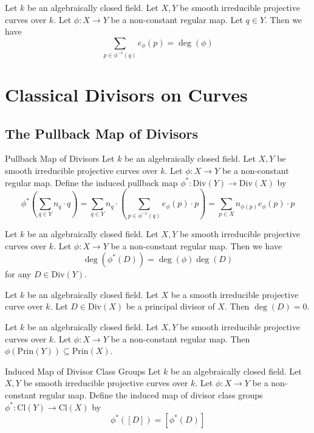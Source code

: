 \documentclass[a4paper]{article}
\begin{document}
\begin{prp}{}{} Let $k$ be an algebraically closed field. Let $X,Y$ be smooth irreducible projective curves over $k$. Let $\phi:X\to Y$ be a non-constant regular map. Let $q\in Y$. Then we have $$\sum_{p\in\phi^{-1}(q)}e_\phi(p)=\deg(\phi)$$
\end{prp}

\pagebreak
\section{Classical Divisors on Curves}
\subsection{The Pullback Map of Divisors}
\begin{defn}{Pullback Map of Divisors}{} Let $k$ be an algebraically closed field. Let $X,Y$ be smooth irreducible projective curves over $k$. Let $\phi:X\to Y$ be a non-constant regular map. Define the induced pullback map $\phi^\ast:\text{Div}(Y)\to\text{Div}(X)$ by $$\phi^\ast\left(\sum_{q\in Y} n_q\cdot q\right)=\sum_{q\in Y}n_q\cdot\left(\sum_{p\in\phi^{-1}(q)}e_\phi(p)\cdot p\right)=\sum_{p\in X}n_{\phi(p)}e_\phi(p)\cdot p$$
\end{defn}

\begin{prp}{}{} Let $k$ be an algebraically closed field. Let $X,Y$ be smooth irreducible projective curves over $k$. Let $\phi:X\to Y$ be a non-constant regular map. Then we have $$\deg(\phi^\ast(D))=\deg(\phi)\deg(D)$$ for any $D\in\text{Div}(Y)$. 
\end{prp}

\begin{prp}{}{} Let $k$ be an algebraically closed field. Let $X$ be a smooth irreducible projective curve over $k$. Let $D\in\text{Div}(X)$ be a principal divisor of $X$. Then $\deg(D)=0$. 
\end{prp}

\begin{prp}{}{} Let $k$ be an algebraically closed field. Let $X,Y$ be smooth irreducible projective curves over $k$. Let $\phi:X\to Y$ be a non-constant regular map. Then $\phi(\text{Prin}(Y))\subseteq\text{Prin}(X)$. 
\end{prp}

\begin{defn}{Induced Map of Divisor Class Groups}{} Let $k$ be an algebraically closed field. Let $X,Y$ be smooth irreducible projective curves over $k$. Let $\phi:X\to Y$ be a non-constant regular map. Define the induced map of divisor class groups $\phi^\ast:\text{Cl}(Y)\to\text{Cl}(X)$ by $$\phi^\ast([D])=[\phi^\ast(D)]$$
\end{defn}
\end{document}
